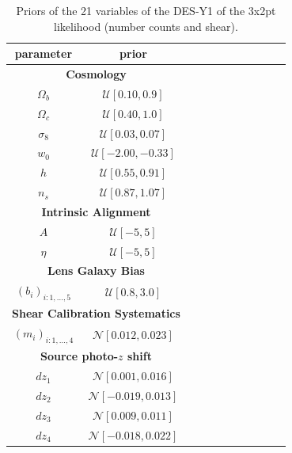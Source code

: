 \documentclass[final,5p,times,twocolumn,authoryear]{elsarticle}
\begin{document}
\begin{table}[htb]
\caption{Priors of the 21 variables of the DES-Y1 of the 3x2pt likelihood (number counts and shear).}
\label{tab-DESY1}
 \centering
\begin{tabular}{ccccccccccc}
\hline
 parameter &  prior \\
 \hline
  \multicolumn{2}{c}{\textbf{Cosmology}} \\
$\Omega_b$ & $\mathcal{U}[0.10, 0.9]$ \\
$\Omega_c$ & $\mathcal{U}[0.40, 1.0]$ \\
$\sigma_8$ & $\mathcal{U}[0.03, 0.07]$ \\
$w_0$ & $\mathcal{U}[-2.00, -0.33]$ \\
$h$ & $\mathcal{U}[0.55, 0.91]$ \\
$n_s$ & $\mathcal{U}[0.87, 1.07]$ \\
\multicolumn{2}{c}{\textbf{Intrinsic Alignment}} \\
$A$ & $\mathcal{U}[-5,5]$ \\
$\eta$ &$\mathcal{U}[-5,5]$ \\
\multicolumn{2}{c}{\textbf{Lens Galaxy Bias}} \\
$(b_i)_{i:1,\dots,5}$ & $\mathcal{U}[0.8,3.0]$ \\
\multicolumn{2}{c}{\textbf{Shear Calibration Systematics}} \\
$(m_i)_{i:1,\dots,4}$ & $\mathcal{N}[0.012,0.023]$ \\
\multicolumn{2}{c}{\textbf{Source photo-$z$ shift}} \\
$dz_1$ & $\mathcal{N}[0.001,0.016]$ \\
$dz_2$ & $\mathcal{N}[-0.019,0.013]$ \\
$dz_3$ & $\mathcal{N}[0.009,0.011]$ \\
$dz_4$ & $\mathcal{N}[-0.018,0.022]$ \\
\hline
\end{tabular}
\end{table}
\end{document}
